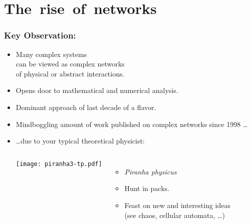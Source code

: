 \section{The\ rise\ of\  networks}

\begin{frame}
  \frametitle{Key Observation:}

  \begin{itemize}
  \item <1->
    Many \alert{complex systems}\\ 
    can be viewed as \alert{complex networks}\\
    of physical or abstract interactions.
  \item <2->
    Opens door to mathematical and numerical analysis.
  \item <3-> 
    Dominant approach of last decade of 
    a  flavor.
  \item <4-> 
    Mindboggling amount of work published 
    on complex networks since 1998 \ldots
  \item <5-> 
    \ldots due to your typical theoretical physicist:
    \begin{overprint}
      \smallskip
      \begin{columns}
        \texttt{[image: piranha3-tp.pdf]}
        \begin{itemize}
        \item \textit{Piranha physicus}
        \item<7-> Hunt in packs.
        \item<8-> Feast on new and interesting ideas \\
          {\small (see chaos, cellular automata, \ldots)}
        \end{itemize}
      \end{columns}
    \end{overprint}
  \end{itemize}

\end{frame}


